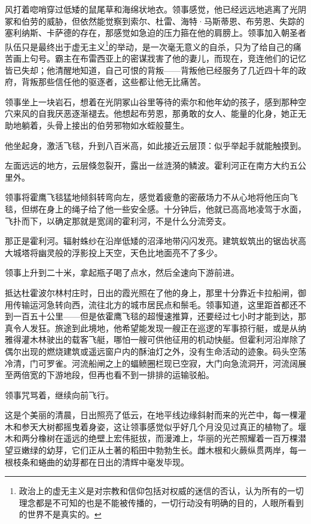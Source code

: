 \documentclass[AutoFakeBold=true]{book}
\begin{document}
风打着唿哨穿过低矮的鼠尾草和海绵状地衣。领事感觉，他已经远远地逃离了光阴冢和伯劳的威胁，但依然能觉察到索尔、杜雷、海特·马斯蒂恩、布劳恩、失踪的塞利纳斯、卡萨德的存在，那感觉如急迫的压力箍在他的肩膀上。领事加入朝圣者队伍只是最终出于虚无主义\footnote{政治上的虚无主义是对宗教和信仰包括对权威的迷信的否认，认为所有的一切理念都是不可知的也是不能被传播的，一切行动没有明确的目的，人眼所看到的世界不是真实的。}的举动，是一次毫无意义的自杀，只为了给自己的痛苦画上句号。霸主在布雷西亚上的密谋戕害了他的妻儿，而现在，竞连他们的记忆皆已失却；他清醒地知道，自己可恨的背叛——背叛他已经服务了几近四十年的政府，背叛那些信任他的驱逐者，这些都让他无比痛苦。

领事坐上一块岩石，想着在光阴冢山谷里等待的索尔和他年幼的孩子，感到那种空穴来风的自我厌恶逐渐褪去。他想起布劳恩，那勇敢的女人、能量的化身，她正无助地躺着，头骨上接出的伯劳邪物如水蛭般蔓生。

他坐起身，激活飞毯，升到八百米高，如此接近云层顶：似乎举起手就能触摸到。

左面远远的地方，云层倏忽裂开，露出一丝涟漪的鳞波。霍利河正在南方大约五公里外。

领事将霍鹰飞毯猛地倾斜转弯向左，感觉着疲惫的密蔽场力不从心地将他压向飞毯，但绑在身上的绳子给了他一些安全感。十分钟后，他就已高高地凌驾于水面，飞扑而下，以确定那就是宽阔的霍利河，不是什么分流旁支。

那正是霍利河。辐射蛛纱在沿岸低矮的沼泽地带闪闪发亮。建筑蚁筑出的锯齿状高大城塔将幽灵般的浮影投上天空，天色比地面亮不了多少。

领事上升到二十米，拿起瓶子喝了点水，然后全速向下游前进。

\vspace*{1em}

抵达杜霍波尔林村庄时，日出的霞光照在了他的身上，那里十分靠近卡拉船闸，御用传输运河急转向西，流往北方的城市居民点和鬃毛。领事知道，这里距首都还不到一百五十公里——但是依霍鹰飞毯的超慢速推算，还要经过七小时才能到达，那真令人发狂。旅途到此境地，他希望能发现一艘正在巡逻的军事掠行艇，或是从纳雅得灌木林驶出的载客飞艇，哪怕一艘可供他征用的机动快艇。但霍利河沿岸除了偶尔出现的燃烧建筑或遥远窗户内的酥油灯之外，没有生命活动的迹象。码头空荡冷清，门可罗雀。河流船闸之上的蝠鲼圈栏现已空寂，大门向急流洞开，河流阔展至两倍宽的下游地段，但再也看不到一排排的运输驳船。

领事咒骂着，继续向前飞行。

这是个美丽的清晨，日出照亮了低云，在地平线边缘斜射而来的光芒中，每一棵灌木和参天大树都摇曳着身姿，这让领事感觉似乎好几个月没见过真正的植物了。堰木和两分橡树在遥远的绝壁上宏伟挺拔，而漫滩上，华丽的光芒照耀着一百万棵潜望豆嫩绿的幼芽，它们正从土著的稻田中勃勃生长。雌木根和火蕨纵贯两岸，每一根枝条和蜷曲的幼芽都在日出的清辉中毫发毕现。
\end{document}
